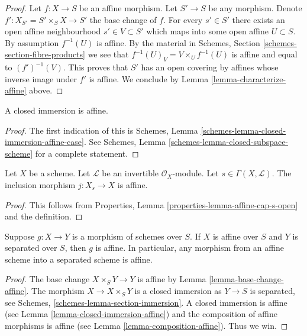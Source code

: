 \begin{proof}
Let $f : X \to S$ be an affine morphism. Let $S' \to S$ be any morphism.
Denote $f' : X_{S'} = S' \times_S X \to S'$ the base change of $f$.
For every $s' \in S'$ there exists an open affine neighbourhood
$s' \in V \subset S'$ which maps into some open affine $U \subset S$.
By assumption $f^{-1}(U)$ is affine. By the material in
Schemes, Section \ref{schemes-section-fibre-products} we see
that $f^{-1}(U)_{V} = V \times_U f^{-1}(U)$ is affine and equal
to $(f')^{-1}(V)$. This proves that $S'$ has an open covering by
affines whose inverse image under $f'$ is affine. We conclude
by Lemma \ref{lemma-characterize-affine} above.
\end{proof}

\begin{lemma}
\label{lemma-closed-immersion-affine}
A closed immersion is affine.
\end{lemma}

\begin{proof}
The first indication of this is
Schemes, Lemma \ref{schemes-lemma-closed-immersion-affine-case}.
See Schemes, Lemma \ref{schemes-lemma-closed-subspace-scheme}
for a complete statement.
\end{proof}

\begin{lemma}
\label{lemma-affine-s-open}
Let $X$ be a scheme.
Let $\mathcal{L}$ be an invertible $\mathcal{O}_X$-module.
Let $s \in \Gamma(X, \mathcal{L})$.
The inclusion morphism $j : X_s \to X$ is affine.
\end{lemma}

\begin{proof}
This follows from Properties, Lemma \ref{properties-lemma-affine-cap-s-open}
and the definition.
\end{proof}

\begin{lemma}
\label{lemma-affine-permanence}
Suppose $g : X \to Y$ is a morphism of schemes over $S$.
If $X$ is affine over $S$ and $Y$ is separated over $S$,
then $g$ is affine. In particular, any morphism from an
affine scheme into a separated scheme is affine.
\end{lemma}

\begin{proof}
The base change $X \times_S Y \to Y$ is affine by
Lemma \ref{lemma-base-change-affine}.
The morphism $X \to X \times_S Y$ is
a closed immersion as $Y \to S$ is separated, see
Schemes, \ref{schemes-lemma-section-immersion}.
A closed immersion is affine (see Lemma \ref{lemma-closed-immersion-affine})
and the composition of affine morphisms is affine
(see Lemma \ref{lemma-composition-affine}). Thus we win.
\end{proof}

